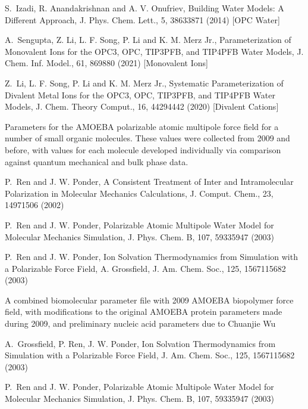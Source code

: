 \documentclass[letterpaper,11pt,english]{sphinxmanual}
\begin{document}
\sphinxAtStartPar
S. Izadi, R. Anandakrishnan and A. V. Onufriev, Building Water Models: A Different Approach, J. Phys. Chem. Lett., 5, 3863\sphinxhyphen{}3871 (2014)  {[}OPC Water{]}

\sphinxAtStartPar
A. Sengupta, Z. Li, L. F. Song, P. Li and K. M. Merz Jr., Parameterization of Monovalent Ions for the OPC3, OPC, TIP3P\sphinxhyphen{}FB, and TIP4P\sphinxhyphen{}FB Water Models, J. Chem. Inf. Model., 61, 869\sphinxhyphen{}880 (2021)  {[}Monovalent Ions{]}

\sphinxAtStartPar
Z. Li, L. F. Song, P. Li and K. M. Merz Jr., Systematic Parameterization of Divalent Metal Ions for the OPC3, OPC, TIP3P\sphinxhyphen{}FB, and TIP4P\sphinxhyphen{}FB Water Models, J. Chem. Theory Comput., 16, 4429\sphinxhyphen{}4442 (2020)  {[}Divalent Cations{]}

\sphinxAtStartPar
{}

\sphinxAtStartPar
Parameters for the AMOEBA polarizable atomic multipole force field for a number of small organic molecules. These values were collected from 2009 and before, with values for each molecule developed individually via comparison against quantum mechanical and bulk phase data.

\sphinxAtStartPar
P. Ren and J. W. Ponder, A Consistent Treatment of Inter\sphinxhyphen{} and Intramolecular Polarization in Molecular Mechanics Calculations, J. Comput. Chem., 23, 1497\sphinxhyphen{}1506 (2002)

\sphinxAtStartPar
P. Ren and J. W. Ponder, Polarizable Atomic Multipole Water Model for Molecular Mechanics Simulation, J. Phys. Chem. B, 107, 5933\sphinxhyphen{}5947 (2003)

\sphinxAtStartPar
P. Ren and J. W. Ponder, Ion Solvation Thermodynamics from Simulation with a Polarizable Force Field, A. Grossfield, J. Am. Chem. Soc., 125, 15671\sphinxhyphen{}15682 (2003)

\sphinxAtStartPar
{}

\sphinxAtStartPar
A combined biomolecular parameter file with 2009 AMOEBA biopolymer force field, with modifications to the original AMOEBA protein parameters made during 2009, and preliminary nucleic acid parameters due to Chuanjie Wu

\sphinxAtStartPar
A. Grossfield, P. Ren, J. W. Ponder, Ion Solvation Thermodynamics from Simulation with a Polarizable Force Field, J. Am. Chem. Soc., 125, 15671\sphinxhyphen{}15682 (2003)

\sphinxAtStartPar
P. Ren and J. W. Ponder, Polarizable Atomic Multipole Water Model for Molecular Mechanics Simulation, J. Phys. Chem. B, 107, 5933\sphinxhyphen{}5947 (2003)
\end{document}
